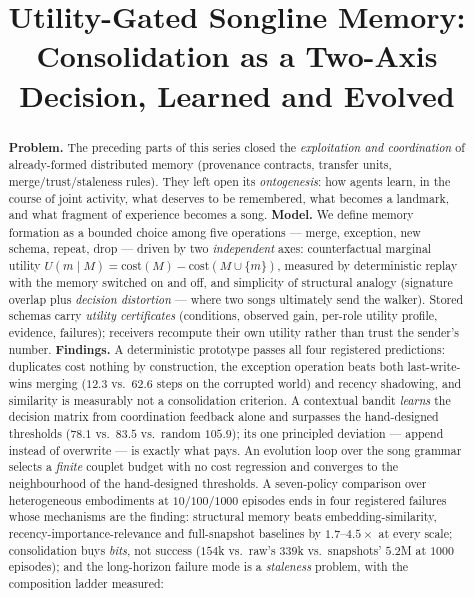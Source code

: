 \documentclass{article}
\title{Utility-Gated Songline Memory:\\Consolidation as a
Two-Axis Decision, Learned and Evolved}
\begin{document}
\maketitle

\begin{abstract}
\textbf{Problem.} The preceding parts of this series closed the
\emph{exploitation and coordination} of already-formed distributed
memory (provenance contracts, transfer units, merge/trust/staleness
rules). They left open its \emph{ontogenesis}: how agents learn, in
the course of joint activity, what deserves to be remembered, what
becomes a landmark, and what fragment of experience becomes a song.
\textbf{Model.} We define memory formation as a bounded choice among
five operations --- merge, exception, new schema, repeat, drop ---
driven by two \emph{independent} axes: counterfactual marginal
utility $U(m \mid M) = \mathrm{cost}(M) - \mathrm{cost}(M \cup
\{m\})$, measured by deterministic replay with the memory switched
on and off, and simplicity of structural analogy (signature overlap
plus \emph{decision distortion} --- where two songs ultimately send
the walker). Stored schemas carry \emph{utility certificates}
(conditions, observed gain, per-role utility profile, evidence,
failures); receivers recompute their own utility rather than trust
the sender's number.
\textbf{Findings.} A deterministic prototype passes all four
registered predictions: duplicates cost nothing by construction, the
exception operation beats both last-write-wins merging ($12.3$ vs.\
$62.6$ steps on the corrupted world) and recency shadowing, and
similarity is measurably not a consolidation criterion. A contextual
bandit \emph{learns} the decision matrix from coordination feedback
alone and surpasses the hand-designed thresholds ($78.1$ vs.\ $83.5$
vs.\ random $105.9$); its one principled deviation --- append instead
of overwrite --- is exactly what pays. An evolution loop over the
song grammar selects a \emph{finite} couplet budget with no cost
regression and converges to the neighbourhood of the hand-designed
thresholds. A seven-policy comparison over heterogeneous embodiments
at $10/100/1000$ episodes ends in four registered failures whose
mechanisms are the finding: structural memory beats
embedding-similarity, recency-importance-relevance and full-snapshot
baselines by $1.7$--$4.5\times$ at every scale; consolidation buys
\emph{bits}, not success ($154$k vs.\ raw's $339$k vs.\ snapshots'
$5.2$M at $1000$ episodes); and the long-horizon failure mode is a
\emph{staleness} problem, with the composition ladder measured:

\end{abstract}
\end{document}

